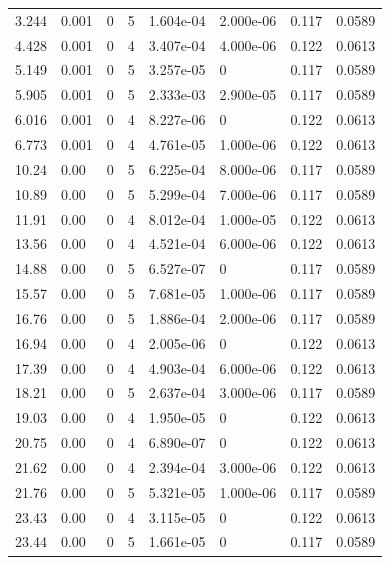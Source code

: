 \documentclass[preview]{standalone}
\begin{document}
{{\begin{tabular}{L{1.2cm}C{1.2cm} C{0.3cm}C{0.5cm} C{1.4cm}C{1.4cm} C{1.4cm}C{1.4cm}}
  3.244  &  0.001  & 0     &  5 &  1.604e-04  & 2.000e-06  & 0.117 &  0.0589   \\ 
  4.428  &  0.001  & 0     &  4 &  3.407e-04  & 4.000e-06  & 0.122 &  0.0613   \\ 
  5.149  &  0.001  & 0     &  5 &  3.257e-05  & 0  & 0.117 &  0.0589   \\ 
  5.905  &  0.001  & 0     &  5 &  2.333e-03  & 2.900e-05  & 0.117 &  0.0589   \\ 
  6.016  &  0.001  & 0     &  4 &  8.227e-06  & 0  & 0.122 &  0.0613   \\ 
  6.773  &  0.001  & 0     &  4 &  4.761e-05  & 1.000e-06  & 0.122 &  0.0613   \\ 
  10.24  &  0.00  & 0     &  5 &  6.225e-04  & 8.000e-06  & 0.117 &  0.0589   \\ 
  10.89  &  0.00  & 0     &  5 &  5.299e-04  & 7.000e-06  & 0.117 &  0.0589   \\ 
  11.91  &  0.00  & 0     &  4 &  8.012e-04  & 1.000e-05  & 0.122 &  0.0613   \\ 
  13.56  &  0.00  & 0     &  4 &  4.521e-04  & 6.000e-06  & 0.122 &  0.0613   \\ 
  14.88  &  0.00  & 0     &  5 &  6.527e-07  & 0  & 0.117 &  0.0589   \\ 
  15.57  &  0.00  & 0     &  5 &  7.681e-05  & 1.000e-06  & 0.117 &  0.0589   \\ 
  16.76  &  0.00  & 0     &  5 &  1.886e-04  & 2.000e-06  & 0.117 &  0.0589   \\ 
  16.94  &  0.00  & 0     &  4 &  2.005e-06  & 0  & 0.122 &  0.0613   \\ 
  17.39  &  0.00  & 0     &  4 &  4.903e-04  & 6.000e-06  & 0.122 &  0.0613   \\ 
  18.21  &  0.00  & 0     &  5 &  2.637e-04  & 3.000e-06  & 0.117 &  0.0589   \\ 
  19.03  &  0.00  & 0     &  4 &  1.950e-05  & 0  & 0.122 &  0.0613   \\ 
  20.75  &  0.00  & 0     &  4 &  6.890e-07  & 0  & 0.122 &  0.0613   \\ 
  21.62  &  0.00  & 0     &  4 &  2.394e-04  & 3.000e-06  & 0.122 &  0.0613   \\ 
  21.76  &  0.00  & 0     &  5 &  5.321e-05  & 1.000e-06  & 0.117 &  0.0589   \\ 
  23.43  &  0.00  & 0     &  4 &  3.115e-05  & 0  & 0.122 &  0.0613   \\ 
  23.44  &  0.00  & 0     &  5 &  1.661e-05  & 0  & 0.117 &  0.0589   \\ 

\end{tabular}}}
\end{document}
